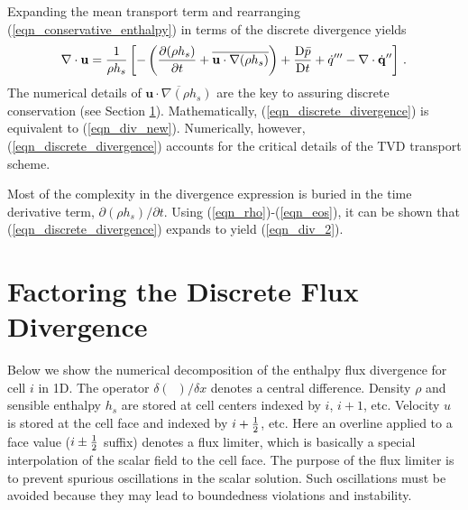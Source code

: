 Expanding the mean transport term and rearranging (\ref{eqn_conservative_enthalpy}) in terms of the discrete divergence yields
\begin{equation}
\label{eqn_discrete_divergence}
\nabla\cdot \mathbf{u} = \frac{1}{\rho h_s}\left[ -\left( \frac{\partial (\rho h_s)}{\partial t} + \overline{\mathbf{u}\cdot\nabla(\rho h_s)} \right) + \frac{\mbox{D} \bar{p}}{\mbox{D} t} + \dot{q}^{\prime\prime\prime} - \nabla\cdot \dot{\mathbf{q}}^{\prime\prime} \right] \,\mbox{.}
\end{equation}
The numerical details of $\overline{\mathbf{u}\cdot\nabla(\rho h_s)}$ are the key to assuring discrete conservation (see Section \ref{app_transport_decomposition}). Mathematically, (\ref{eqn_discrete_divergence}) is  equivalent to (\ref{eqn_div_new}). Numerically, however, (\ref{eqn_discrete_divergence}) accounts for the critical details of the TVD transport scheme.

Most of the complexity in the divergence expression is buried in the time derivative term, $\partial (\rho h_s)/\partial t$.  Using (\ref{eqn_rho})-(\ref{eqn_eos}), it can be shown that (\ref{eqn_discrete_divergence}) expands to yield (\ref{eqn_div_2}).



\section{Factoring the Discrete Flux Divergence}
\label{app_transport_decomposition}

Below we show the numerical decomposition of the enthalpy flux divergence for cell $i$ in 1D.  The operator $\delta(\,\,\,)/\delta x$ denotes a central difference.  Density $\rho$ and sensible enthalpy $h_s$ are stored at cell centers indexed by $i$, $i+1$, etc.  Velocity $u$ is stored at the cell face and indexed by $i+\mbox{$\frac{1}{2}$}$, etc.  Here an overline applied to a face value ($i\pm\mbox{$\frac{1}{2}$}$ suffix) denotes a flux limiter, which is basically a special interpolation of the scalar field to the cell face.  The purpose of the flux limiter is to prevent spurious oscillations in the scalar solution.  Such oscillations must be avoided because they may lead to boundedness violations and instability.

